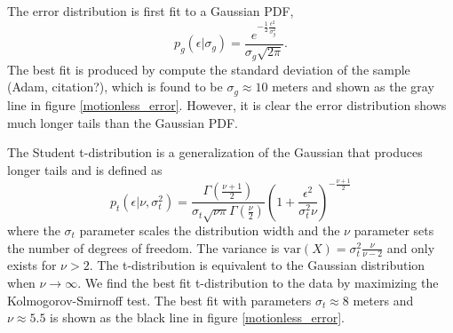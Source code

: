 \documentclass[twocol]{ametsoc}
\begin{document}
The error distribution is first fit to a Gaussian PDF,
\begin{equation}
\label{gaussian_pdf}
p_g(\epsilon|\sigma_g) = \frac{e^{-\frac{1}{2}\frac{\epsilon^2}{\sigma_g^2}} }{\sigma_g \sqrt{ 2 \pi}}.
\end{equation}
The best fit is produced by compute the standard deviation of the sample (Adam, citation?), which is found to be $\sigma_g \approx 10$ meters and shown as the gray line in figure \ref{motionless_error}. However, it is clear the error distribution shows much longer tails than the Gaussian PDF.

The Student t-distribution is a generalization of the Gaussian that produces longer tails and is defined as 
\begin{equation}
\label{student_pdf}
p_t\left(\epsilon |\nu,\sigma_t^2\right) = \frac{\Gamma\left( \frac{\nu + 1}{2} \right)}{\sigma_t \sqrt{\nu \pi} \Gamma\left(\frac{\nu}{2}\right)} \left( 1 + \frac{\epsilon^2}{\sigma_t^2 \nu} \right)^{-\frac{\nu+1}{2}}
\end{equation}
where the $\sigma_t$ parameter scales the distribution width and the $\nu$ parameter sets the number of degrees of freedom. The variance is $\textrm{var}(X)=\sigma_t^2 \frac{\nu}{\nu-2}$ and only exists for $\nu > 2$. The t-distribution is equivalent to the Gaussian distribution when $\nu \rightarrow \infty$. We find the best fit t-distribution to the data by maximizing the Kolmogorov-Smirnoff test. The best fit with parameters $\sigma_t \approx 8$ meters and $\nu \approx 5.5$ is shown as the black line in figure \ref{motionless_error}.
\end{document}
